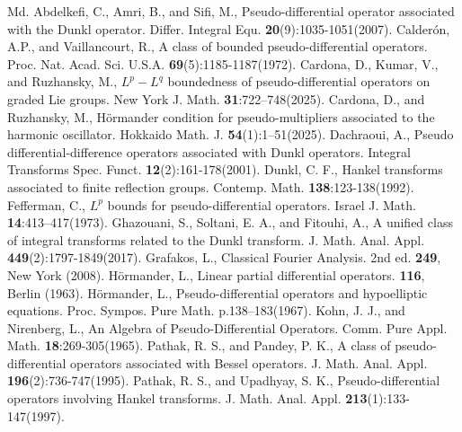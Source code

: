 \documentclass[12pt,a4paper,reqno]{amsproc}
\theoremstyle{definition}
\theoremstyle{remark}
\numberwithin{equation}{section}
\begin{document}
\begin{thebibliography}{Md.}
Abdelkefi, C., Amri, B.,  and Sifi, M.,  Pseudo-differential operator associated with the Dunkl operator. Differ. Integral Equ. \textbf{20}(9):1035-1051(2007).
 Calder\'on, A.P., and  Vaillancourt, R., A class of bounded pseudo-differential operators. Proc. Nat. Acad. Sci. U.S.A. \textbf{69}(5):1185-1187(1972). 
Cardona, D., Kumar, V., and Ruzhansky, M., $L^p - L^q$  boundedness of pseudo-differential operators on graded Lie groups. New York J. Math. \textbf{31}:722–748(2025).
 Cardona, D., and  Ruzhansky, M.,  H\"ormander condition for pseudo-multipliers associated to the harmonic oscillator. Hokkaido Math. J. \textbf{54}(1):1–51(2025).
Dachraoui, A.,  Pseudo differential-difference operators associated with Dunkl operators. Integral Transforms Spec. Funct. \textbf{12}(2):161-178(2001).
 Dunkl, C. F., Hankel transforms associated to finite reflection groups. Contemp. Math. \textbf{138}:123-138(1992).
Fefferman, C., $L^p$  bounds for pseudo-differential operators.
Israel J. Math. \textbf{14}:413–417(1973).
 Ghazouani, S.,   Soltani, E. A., and  Fitouhi, A., A unified class of integral transforms related to the Dunkl transform. J. Math. Anal. Appl.  \textbf{449}(2):1797-1849(2017).
Grafakos, L., Classical Fourier Analysis. 2nd ed. \textbf{249}, New York (2008).
 H\"ormander, L., Linear partial differential operators. \textbf{116}, Berlin (1963).
H\"ormander, L., Pseudo-differential operators and hypoelliptic equations. Proc. Sympos. Pure Math.  p.138–183(1967).
 Kohn, J. J.,  and  Nirenberg, L.,  An Algebra of Pseudo-Differential Operators. Comm. Pure Appl. Math. \textbf{18}:269-305(1965).
Pathak, R. S., and Pandey, P. K., A class of pseudo-differential operators associated with Bessel operators. J. Math. Anal. Appl. \textbf{196}(2):736-747(1995).
Pathak, R. S., and Upadhyay, S. K.,  Pseudo-differential operators involving Hankel transforms. J. Math. Anal. Appl.  \textbf{213}(1):133-147(1997).

\end{thebibliography}
\end{document}
